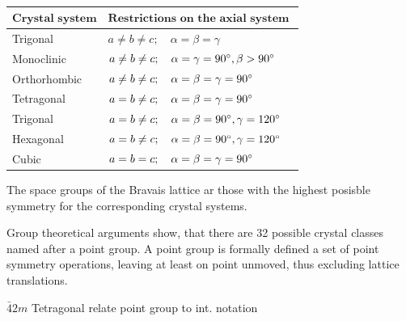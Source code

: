 \begin{table}[htdp]
    \begin{tabular}{|p{}|p{}|}
        \hline
        \rowcolor{LightCyan}
        $\textbf{Crystal system}$ & 
        $\textbf{Restrictions on the axial system   }$ \\ 
        \hline
        Trigonal        & $a \neq b \neq c; \quad \alpha = \beta = \gamma$ \\ 
        Monoclinic      & $a \neq b \neq c; \quad \alpha = \gamma = 90^\circ, \beta > 90^\circ$ \\ 
        Orthorhombic    & $a \neq b \neq c; \quad \alpha = \beta = \gamma = 90^\circ$         \\
        Tetragonal      & $a    = b \neq c; \quad \alpha = \beta = \gamma = 90^\circ$         \\ 
        Trigonal        & $a    = b \neq c; \quad \alpha = \beta = 90^\circ, \gamma = 120^\circ$ \\ 
        Hexagonal       & $a    = b \neq c; \quad \alpha = \beta = 90^\circ, \gamma = 120^\circ$ \\ 
        Cubic           & $a    = b =    c; \quad \alpha = \beta = \gamma = 90^\circ$         \\ 
        \hline
    \end{tabular}
\caption{}
\label{tab:crystal_systems}
\end{table}


The space groups of the Bravais lattice ar those with the 
highest posisble symmetry for the corresponding crystal 
systems. 


Group theoretical arguments show, that there are 32 
possible crystal classes named after a point group. 
A point group is formally defined a set of point symmetry 
operations, leaving at least on point unmoved, thus excluding 
lattice translations. 

$\bar{4}2m$ Tetragonal
relate point group to int. notation


